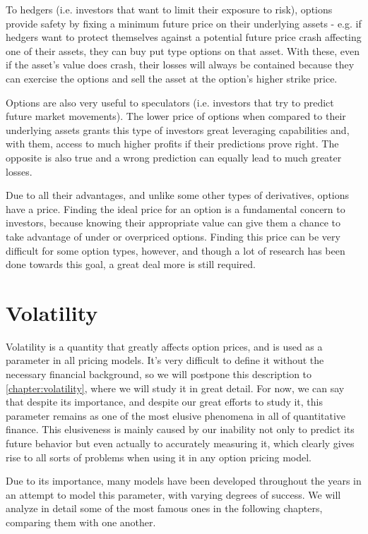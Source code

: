 To hedgers (i.e. investors that want to limit their exposure to risk), options provide safety by fixing a minimum future price on their underlying assets - e.g. if hedgers want to protect themselves against a potential future price crash affecting one of their assets, they can buy put type options on that asset. With these, even if the asset's value does crash, their losses will always be contained because they can exercise the options and sell the asset at the option's higher strike price.

Options are also very useful to speculators (i.e. investors that try to predict future market movements). The lower price of options when compared to their underlying assets grants this type of investors great leveraging capabilities and, with them, access to much higher profits if their predictions prove right. The opposite is also true and a wrong prediction can equally lead to much greater losses.

Due to all their advantages, and unlike some other types of derivatives, options have a price. Finding the ideal price for an option is a fundamental concern to investors, because knowing their appropriate value can give them a chance to take advantage of under or overpriced options.
Finding this price can be very difficult for some option types, however, and though a lot of research has been done towards this goal, a great deal more is still required.


\section{Volatility}
Volatility is a quantity that greatly affects option prices, and is used as a parameter in all pricing models. It's very difficult to define it without the necessary financial background, so we will postpone this description to \autoref{chapter:volatility}, where we will study it in great detail.
For now, we can say that despite its importance, and despite our great efforts to study it, this parameter remains as one of the most elusive phenomena in all of quantitative finance. This elusiveness is mainly caused by our inability not only to predict its future behavior but even actually to accurately measuring it, which clearly gives rise to all sorts of problems when using it in any option pricing model.

Due to its importance, many models have been developed throughout the years in an attempt to model this parameter, with varying degrees of success. We will analyze in detail some of the most famous ones in the following chapters, comparing them with one another.

